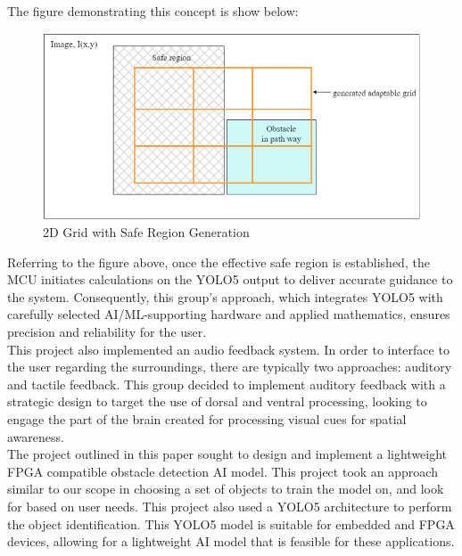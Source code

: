 \noindent The figure demonstrating this concept is show below:
				
\begin{figure}[H]
	\centering
	\includegraphics[width=\textwidth]{./Images/Figure1_Grid_Detection.png}
	\caption{\label{fig:Grid-Generatio}2D Grid with Safe Region Generation}
\end{figure}

\noindent Referring to the figure above, once the effective safe region is established, the MCU initiates calculations on the YOLO5 output to deliver accurate guidance to the system. Consequently, this group's approach, which integrates YOLO5 with carefully selected AI/ML-supporting hardware and applied mathematics, ensures precision and reliability for the user. \\

\noindent This project also implemented an audio feedback system. In order to interface to the user regarding the surroundings, there are typically two approaches: auditory and tactile feedback. This group decided to implement auditory feedback with a strategic design to target the use of dorsal and ventral processing, looking to engage the part of the brain created for processing visual cues for spatial awareness.\\

\noindent The project outlined in this paper \cite{CVRef2} sought to design and implement a lightweight FPGA compatible obstacle detection AI model. This project took an approach similar to our scope in choosing a set of objects to train the model on, and look for based on user needs. This project also used a YOLO5 architecture to perform the object identification. This YOLO5 model is suitable for embedded and FPGA devices, allowing for a lightweight AI model that is feasible for these applications. \\


